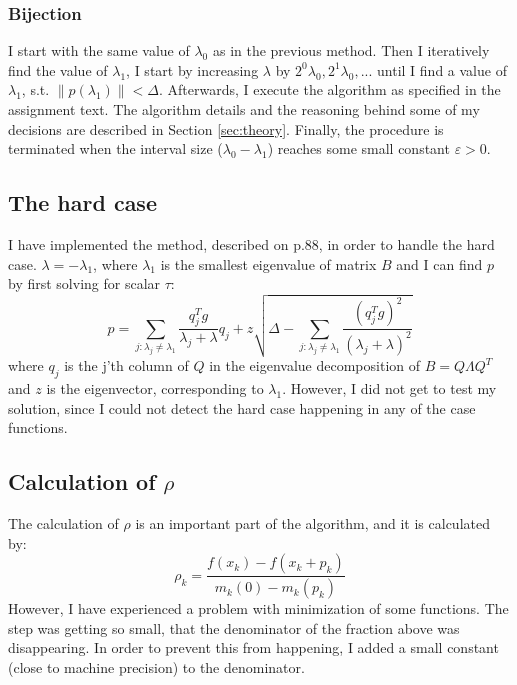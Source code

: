 \documentclass[a4paper]{article}
\begin{document}
\subsubsection{Bijection}
\label{subsubsec:bijection}
I start with the same value of $\lambda_0$ as in the previous method.
Then I iteratively find the value of $\lambda_1$, I start by increasing
$\lambda$ by $2^0 \lambda_0, 2^1 \lambda_0, ...$
until I find a value of $\lambda_1$, s.t.
$\| p(\lambda_1) \| <\Delta$. Afterwards, I execute the algorithm as specified
in the assignment text. The algorithm details and the reasoning behind some of
my decisions are described in Section \ref{sec:theory}. Finally, the procedure is
terminated when the interval size ($\lambda_0 - \lambda_1$) reaches some small
constant $\varepsilon > 0$.

\subsection{The hard case}
I have implemented the method, described on p.88, in order to handle the hard
case. $\lambda = -\lambda_1$, where $\lambda_1$ is the smallest eigenvalue of matrix
$B$ and I can find $p$ by first solving for scalar $\tau$:
\[
p=\sum_{j: \lambda_{j} \neq \lambda_{1}} \frac{q_{j}^{T} g}{\lambda_{j}+\lambda}
q_{j} + z\sqrt{\Delta - \sum_{j: \lambda_{j} \neq \lambda_{1}}
  \frac{\left(q_{j}^{T} g\right)^{2}}{\left(\lambda_{j}+\lambda\right)^{2}}}
\]
where $q_j$ is the j'th column of $Q$ in the eigenvalue decomposition of
$B = Q\Lambda Q^T$ and $z$ is the eigenvector, corresponding to $\lambda_1$.
However, I did not get to test my solution, since I could not detect the hard
case happening in any of the case functions.

\subsection{Calculation of $\rho$}
The calculation of $\rho$ is an important part of the algorithm, and it is
calculated by:
\[
\rho_{k}=\frac{f\left(x_{k}\right)-f\left(x_{k}+p_{k}\right)}{m_{k}(0)-m_{k}\left(p_{k}\right)}
\]
However, I have experienced a problem with minimization of some functions.
The step was getting so small, that the denominator of the fraction above
was disappearing. In order to prevent this from happening, I added a small
constant (close to machine precision) to the denominator.
\end{document}
